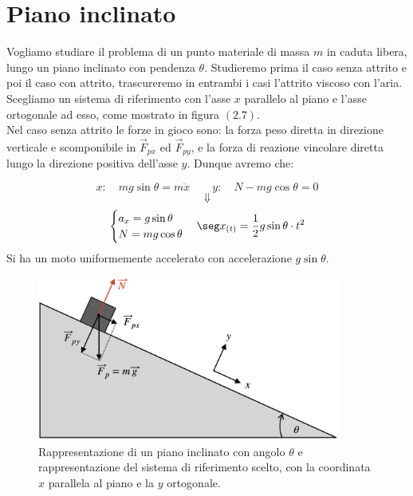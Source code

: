 \section{Piano inclinato}
Vogliamo studiare il problema di un punto materiale di massa $m$ in caduta libera, lungo un piano inclinato con pendenza $\theta$. Studieremo prima il caso senza attrito e poi il caso con attrito, trascureremo in entrambi i casi l'attrito viscoso con l'aria. \\
Scegliamo un sistema di riferimento con l'asse $x$ parallelo al piano e l'asse ortogonale ad esso, come mostrato in figura $(2.7)$.
\\ Nel caso senza attrito le forze in gioco sono: la forza peso diretta in direzione verticale e scomponibile in $\vec F_{px}$ ed $\vec F_{py}$, e la forza di reazione vincolare diretta lungo la direzione positiva dell'asse $y$. Dunque avremo che:

\begin{equation}
x:\quad mg\sin\theta = m\ddot x\quad\quad y: \quad N - mg\cos\theta = 0
\end{equation}
$$\Downarrow$$
\begin{equation}
\begin{cases}
a_x = g\sin\theta\\
N = mg\cos\theta
\end{cases}\seg x_{(t)} = \frac12 g\sin\theta\cdot t^2
\end{equation}
Si ha un moto uniformemente accelerato con accelerazione $g\sin\theta$.

\begin{figure}[htbp]
\begin{center}
\includegraphics[width=10cm]{images/pianoincl.png}
\caption{Rappresentazione di un piano inclinato con angolo $\theta$ e rappresentazione del sistema di riferimento scelto, con la coordinata $x$ parallela al piano e la $y$ ortogonale.}
\label{default}
\end{center}
\end{figure}

